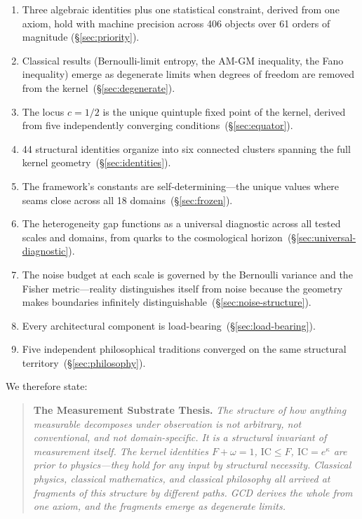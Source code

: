 \documentclass[
  aps,
  prd,
  twocolumn,
  superscriptaddress,
  nofootinbib,
  floatfix
]{revtex4-2}
\newcommand{\IC}{\mathrm{IC}}
\begin{document}
\begin{enumerate}[leftmargin=*,label=(\arabic*)]
\item Three algebraic identities plus one statistical constraint,
  derived from one axiom, hold with machine precision across 406
  objects over 61 orders of magnitude (\S\ref{sec:priority}).

\item Classical results (Bernoulli-limit entropy, the AM-GM
  inequality, the Fano inequality) emerge as degenerate limits when
  degrees of freedom are removed from the
  kernel~(\S\ref{sec:degenerate}).

\item The locus $c = 1/2$ is the unique quintuple fixed point of the
  kernel, derived from five independently converging
  conditions~(\S\ref{sec:equator}).

\item 44 structural identities organize into six connected clusters
  spanning the full kernel geometry~(\S\ref{sec:identities}).

\item The framework's constants are self-determining---the unique
  values where seams close across all 18
  domains~(\S\ref{sec:frozen}).

\item The heterogeneity gap functions as a universal diagnostic
  across all tested scales and domains, from quarks to the
  cosmological horizon~(\S\ref{sec:universal-diagnostic}).

\item The noise budget at each scale is governed by the Bernoulli
  variance and the Fisher metric---reality distinguishes itself
  from noise because the geometry makes boundaries infinitely
  distinguishable~(\S\ref{sec:noise-structure}).

\item Every architectural component is
  load-bearing~(\S\ref{sec:load-bearing}).

\item Five independent philosophical traditions converged on the
  same structural territory~(\S\ref{sec:philosophy}).
\end{enumerate}

We therefore state:

\begin{quote}
\textbf{The Measurement Substrate Thesis.}
\emph{The structure of how anything measurable decomposes under
observation is not arbitrary, not conventional, and not
domain-specific.  It is a structural invariant of measurement
itself.  The kernel identities $F + \omega = 1$, $\IC \leq F$,
$\IC = e^\kappa$ are prior to physics---they hold for any input by
structural necessity.  Classical physics, classical mathematics, and
classical philosophy all arrived at fragments of this structure by
different paths.  GCD derives the whole from one axiom, and the
fragments emerge as degenerate limits.}
\end{quote}
\end{document}
